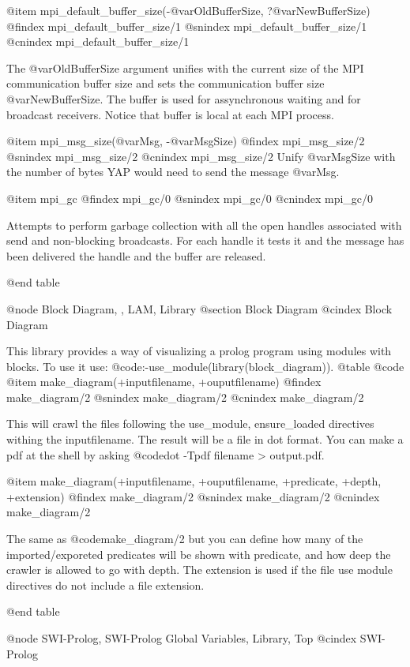 {{{{{{{{{@item mpi_default_buffer_size(-@var{OldBufferSize}, ?@var{NewBufferSize})
@findex mpi_default_buffer_size/1
@snindex mpi_default_buffer_size/1
@cnindex mpi_default_buffer_size/1

The @var{OldBufferSize} argument unifies with the current size of the
MPI communication buffer size and sets the communication buffer size
@var{NewBufferSize}. The buffer is used for assynchronous waiting and
for broadcast receivers. Notice that buffer is local at each MPI
process.


@item mpi_msg_size(@var{Msg}, -@var{MsgSize})
@findex mpi_msg_size/2
@snindex mpi_msg_size/2
@cnindex mpi_msg_size/2
Unify @var{MsgSize} with the number of bytes YAP would need to send the
message @var{Msg}.

@item mpi_gc
@findex mpi_gc/0
@snindex mpi_gc/0
@cnindex mpi_gc/0

Attempts to perform garbage collection with all the open handles
associated with send and non-blocking broadcasts. For each handle it
tests it and the message has been delivered the handle and the buffer
are released.

@end table

@node Block Diagram, , LAM, Library
@section Block Diagram
@cindex Block Diagram

This library provides a way of visualizing a prolog program using modules with blocks.
To use it use: @code{:-use_module(library(block_diagram))}.
@table @code
@item make_diagram(+inputfilename, +ouputfilename)
@findex make_diagram/2
@snindex make_diagram/2
@cnindex make_diagram/2

This will crawl the files following the use_module, ensure_loaded directives withing the inputfilename.
The result will be a file in dot format.
You can make a pdf at the shell by asking @code{dot -Tpdf filename > output.pdf}.

@item make_diagram(+inputfilename, +ouputfilename, +predicate, +depth, +extension)
@findex make_diagram/2
@snindex make_diagram/2
@cnindex make_diagram/2

The same as @code{make_diagram/2} but you can define how many of the imported/exporeted predicates will be shown with predicate, and how deep the crawler is allowed to go with depth. The extension is used if the file use module directives do not include a file extension.

@end table


@node SWI-Prolog, SWI-Prolog Global Variables, Library, Top
@cindex SWI-Prolog

}}}}}}}}}
